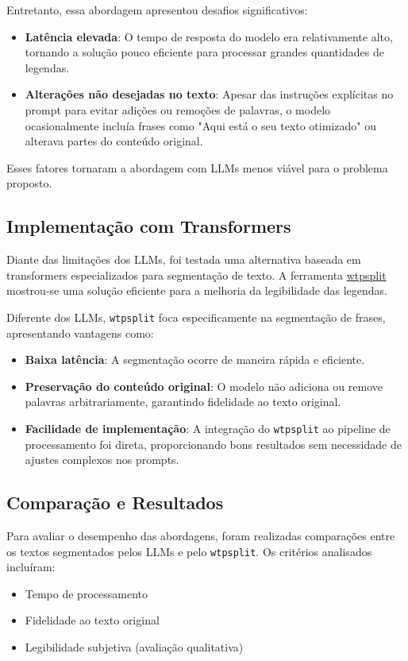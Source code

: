 \documentclass[tcc,capa]{texufpel}
\begin{document}
Entretanto, essa abordagem apresentou desafios significativos:
\begin{itemize}
    \item \textbf{Latência elevada}: O tempo de resposta do modelo era relativamente alto, tornando a solução pouco eficiente para processar grandes quantidades de legendas.
    \item \textbf{Alterações não desejadas no texto}: Apesar das instruções explícitas no prompt para evitar adições ou remoções de palavras, o modelo ocasionalmente incluía frases como "Aqui está o seu texto otimizado" ou alterava partes do conteúdo original.
\end{itemize}

Esses fatores tornaram a abordagem com LLMs menos viável para o problema proposto.

\subsection{Implementação com Transformers}
Diante das limitações dos LLMs, foi testada uma alternativa baseada em transformers especializados para segmentação de texto. A ferramenta \href{https://github.com/segment-any-text/wtpsplit}{wtpsplit} mostrou-se uma solução eficiente para a melhoria da legibilidade das legendas.

Diferente dos LLMs, \texttt{wtpsplit} foca especificamente na segmentação de frases, apresentando vantagens como:
\begin{itemize}
    \item \textbf{Baixa latência}: A segmentação ocorre de maneira rápida e eficiente.
    \item \textbf{Preservação do conteúdo original}: O modelo não adiciona ou remove palavras arbitrariamente, garantindo fidelidade ao texto original.
    \item \textbf{Facilidade de implementação}: A integração do \texttt{wtpsplit} ao pipeline de processamento foi direta, proporcionando bons resultados sem necessidade de ajustes complexos nos prompts.
\end{itemize}

\subsection{Comparação e Resultados}
Para avaliar o desempenho das abordagens, foram realizadas comparações entre os textos segmentados pelos LLMs e pelo \texttt{wtpsplit}. Os critérios analisados incluíram:
\begin{itemize}
    \item Tempo de processamento
    \item Fidelidade ao texto original
    \item Legibilidade subjetiva (avaliação qualitativa)
\end{itemize}
\end{document}

